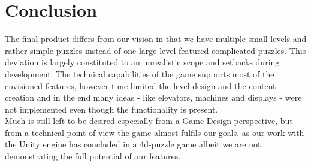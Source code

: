 \section{Conclusion}
The final product differs from our vision in that we have multiple small levels and rather simple puzzles instead of one large level featured complicated puzzles. This deviation is largely constituted to an unrealistic scope and setbacks during development. The technical capabilities of the game supports most of the envisioned features, however time limited the level design and the content creation and in the end many ideas - like elevators, machines and displays - were not implemented even though the functionality is present.\\

Much is still left to be desired especially from a Game Design perspective, but from a technical point of view the game almost fulfils our goals, as our work with the Unity engine has concluded in a 4d-puzzle game albeit we are not demonstrating the full potential of our features.
 